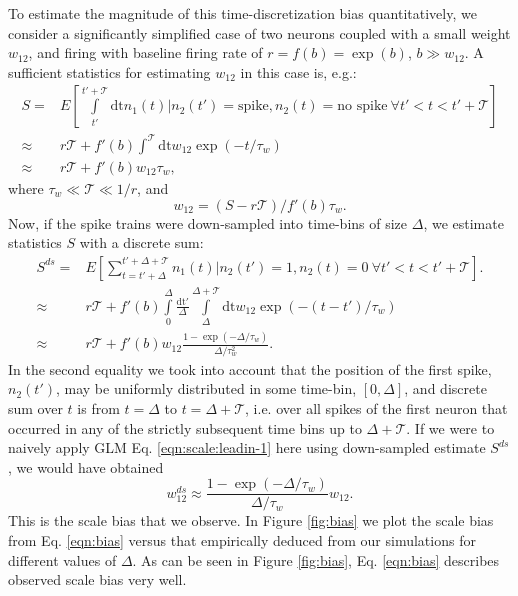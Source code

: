 To estimate the magnitude of this time-discretization bias quantitatively, we consider a significantly simplified case of two neurons coupled with a small weight $w_{12}$, and firing with baseline firing rate of $r=f(b)=\exp(b)$, $b \gg w_{12}$.
A sufficient statistics for estimating $w_{12}$ in this case is, e.g.:
\begin{equation}\label{eqn:scale:leadin-1}
\begin{array}{rl}
S =& E\left[\int\limits_{t'}^{t'+\mathcal{T}} \text{dt} n_1(t) | n_2(t')=\text{spike}, n_2(t)=\text{no spike}\ \forall t'<t<t'+\mathcal{T}\right] \\
\approx & r \mathcal{T} + f'(b) \int^{\mathcal{T}}  \text{dt} w_{12} \exp(-t/\tau_w) \\
\approx & r \mathcal{T} + f'(b) w_{12}\tau_w,
\end{array}
\end{equation}
where $\tau_w \ll \mathcal{T} \ll 1/r$, and 
\begin{equation}\label{eqn:scale:leadin-1}
w_{12}=(S-r\mathcal{T})/f'(b)\tau_w.
\end{equation}
Now, if the spike trains were down-sampled into time-bins of size $\Delta$,
we estimate statistics $S$ with a discrete sum:
\begin{equation}\label{eqn:scale:leadin-2}
\begin{array}{rl}
S^{ds}=&E\left[\sum\limits_{t=t'+\Delta}^{t'+\Delta + \mathcal{T}} n_1(t) | n_2(t')=1, n_2(t)=0\ \forall
t'<t<t'+\mathcal{T}\right]. \\
\approx& r \mathcal{T} + f'(b) \int\limits_0^\Delta \frac{\text{dt}'}{\Delta} \int\limits_{\Delta}^{\Delta + \mathcal{T}} \text{dt} w_{12}\exp(-(t-t')/\tau_w) \\
\approx & r \mathcal{T} +  f'(b)w_{12}\frac{1-\exp(-\Delta/\tau_w)}{\Delta/\tau_w^2}.
\end{array}
\end{equation}
In the second equality we took into account that the position of the first spike, $n_2(t')$, may be uniformly distributed in some time-bin, $[0,\Delta]$, and discrete sum over $t$ is from $t=\Delta$ to $t=\Delta+\mathcal{T}$, i.e. over all spikes of the first neuron that occurred in any of the strictly subsequent time bins up to $\Delta + \mathcal{T}$.
If we were to naively apply GLM Eq. \ref{eqn:scale:leadin-1} here using down-sampled estimate $S^{ds}$, we would have obtained
\begin{equation}\label{eqn:bias}
w_{12}^{ds}\approx \frac{1-\exp(-\Delta/\tau_w)}{\Delta/\tau_w} w_{12}.
\end{equation}
This is the scale bias that we observe.
In Figure \ref{fig:bias} we plot the scale bias from Eq. \ref{eqn:bias} versus that empirically deduced from our simulations for different values of $\Delta$. As can be seen in Figure \ref{fig:bias}, Eq. \ref{eqn:bias} describes observed scale bias very well.

